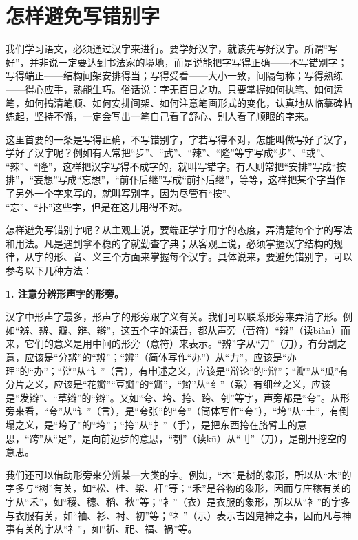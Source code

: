 \section{怎样避免写错别字}

我们学习语文，必须通过汉字来进行。要学好汉字，就该先写好汉字。所谓“写好”，并非说一定要达到书法家的境地，而是说能把字写得正确——不写错别字；写得端正——结构间架安排得当；写得受看——大小一致，间隔匀称；写得熟练——得心应手，熟能生巧。俗话说：字无百日之功。只要掌握如何执笔、如何运笔，如何搞清笔顺、如何安排间架、如何注意笔画形式的变化，认真地从临摹碑帖练起，坚持不懈，一定会写出一笔自己看了舒心、别人看了顺眼的字来。

这里首要的一条是写得正确，不写错别字，字若写得不对，怎能叫做写好了汉字，学好了汉字呢？例如有人常把“步”、“武”、“辣”、“隆”等字写成“步”、“或”、\\
“辣”、“隆”，这样把汉字写得不成字的，就叫写错字。有人则常把“安排”写成“按排”，“妄想”写成“忘想”，“前仆后继”写成“前扑后继”，等等，这样把某个字当作了另外一个字来写的，就叫写别字，因为尽管有“按”、\\
“忘”、“扑”这些字，但是在这儿用得不对。

怎样避免写错别字呢？从主观上说，要端正学字用字的态度，弄清楚每个字的写法和用法。凡是遇到拿不稳的字就勤查字典；从客观上说，必须掌握汉字结构的规律，从字的形、音、义三个方面来掌握每个汉字。具体说来，要避免错别字，可以参考以下几种方法：

\textbf{1. 注意分辨形声字的形旁。}

汉字中形声字最多，形声字的形旁跟字义有关。我们可以联系形旁来弄清字形。例如“辨、辨、瓣、辩、辫”，这五个字的读音，都从声旁（音符）“辩”（读biàn）而来，它们的意义是用中间的形旁（意符）来表示。“辨”字从“刀”（刀），有分割之意，应该是“分辨”的“辨”；“辨”（简体写作“办”）从“力”，应该是“办理”的“办”；“辩”从“讠”（言），有申述之义，应该是“辩论”的“辩”；“瓣”从“瓜”有分片之义，应该是“花瓣”“豆瓣”的“瓣”，“辫”从“纟”（系）有细丝之义，应该是“发辫”、“草辫”的“辫”。又如“夸、垮、挎、跨、刳”等字，声旁都是“夸”。从形旁来看，“夸”从“讠”（言），是“夸张”的“夸”（简体写作“夸”），“垮”从“土”，有倒塌之义，是“垮了”的“垮”；“挎”从“扌”（手），是把东西挎在胳臂上的意思，“跨”从“足”，是向前迈步的意思，“刳”（读kū）从“刂”（刀），是剖开挖空的意思。

我们还可以借助形旁来分辨某一大类的字。例如，“木”是树的象形，所以从“木”的字多与“树”有关，如“松、桂、柴、杆”等；“禾”是谷物的象形，因而与庄稼有关的字从“禾”，如“稷、穗、稻、秋”等；“衤”（衣）是衣服的象形，所以从“衤”的字多与衣服有关，如“袖、衫、衬、初”等；“礻”（示）表示吉凶鬼神之事，因而凡与神事有关的字从“礻”，如“祈、祀、福、祸”等。

